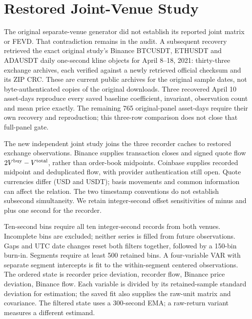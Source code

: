 
\section{Restored Joint-Venue Study}
\label{sec:restored_joint}
The original separate-venue generator did not establish its reported joint matrix or FEVD. That contradiction remains in the audit. A subsequent recovery retrieved the exact original study's Binance BTCUSDT, ETHUSDT and ADAUSDT daily one-second kline objects for April 8--18, 2021: thirty-three exchange archives, each verified against a newly retrieved official checksum and its ZIP CRC. These are current public archives for the original sample dates, not byte-authenticated copies of the original downloads. Three recovered April 10 asset-days reproduce every saved baseline coefficient, invariant, observation count and mean price exactly. The remaining 765 original-panel asset-days require their own recovery and reproduction; this three-row comparison does not close that full-panel gate.

The new independent joint study joins the three recorder caches to restored exchange observations. Binance supplies transaction closes and signed quote flow $2V^{\rm buy}-V^{\rm total}$, rather than order-book midpoints. Coinbase supplies recorded midpoint and deduplicated flow, with provider authentication still open. Quote currencies differ (USD and USDT); basis movements and common information can affect the relation. The two timestamp conventions do not establish subsecond simultaneity. We retain integer-second offset sensitivities of minus and plus one second for the recorder.

Ten-second bins require all ten integer-second records from both venues. Incomplete bins are excluded; neither series is filled from future observations. Gaps and UTC date changes reset both filters together, followed by a 150-bin burn-in. Segments require at least 500 retained bins. A four-variable VAR with separate segment intercepts is fit to the within-segment centered observations. The ordered state is recorder price deviation, recorder flow, Binance price deviation, Binance flow. Each variable is divided by its retained-sample standard deviation for estimation; the saved fit also supplies the raw-unit matrix and covariance. The filtered state uses a 300-second EMA; a raw-return variant measures a different estimand.

